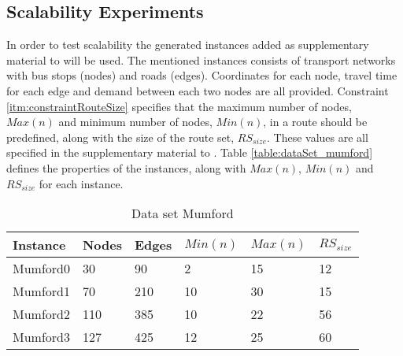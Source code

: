 \subsection{Scalability Experiments}
\label{subsec:scalabilityExperiments_setup}

In order to test scalability the generated instances added as supplementary material to \citet{mumford13} will be used.
The mentioned instances consists of transport networks with bus stops (nodes) and roads (edges). Coordinates for each node, travel time for each edge and demand between each two nodes are all provided. Constraint \vref{itm:constraintRouteSize} specifies that the maximum number of nodes, $Max(n)$ and minimum number of nodes, $Min(n)$, in a route should be predefined, along with the size of the route set, $RS_{size}$. These values are all specified in the supplementary material to \citet{mumford13}. Table \vref{table:dataSet_mumford} defines the properties of the instances, along with $Max(n)$, $Min(n)$ and $RS_{size}$ for each instance.

\begin{table}[H]
	\centering
	\begin{tabular}{|l|l|l|l|l|l|}
    	\hline
    	Instance & Nodes&Edges & $Min(n)$ & $Max(n)$ & $RS_{size}$\\
    	\hline
   	    Mumford0 & 30&90 & 2&15 & 12 \\
   	    Mumford1 & 70&210 & 10&30 & 15 \\
   	    Mumford2 & 110&385 & 10&22 & 56 \\
   	    Mumford3 & 127&425 & 12&25 & 60 \\
   	    \hline
    \end{tabular}
    \caption{Data set Mumford}
    \label{table:dataSet_mumford}
\end{table}
